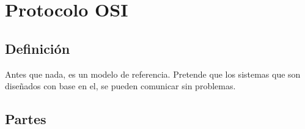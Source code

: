 \documentclass[12pt, fleqn]{report}                             %
\theoremstyle{break}                                            %
\begin{document}
    \chapter{Protocolo OSI}


        \clearpage
        \section{Definición}

            Antes que nada, es un modelo de referencia. Pretende que los sistemas que son diseñados
            con base en el, se pueden comunicar sin problemas.

        \section{Partes}
\end{document}
